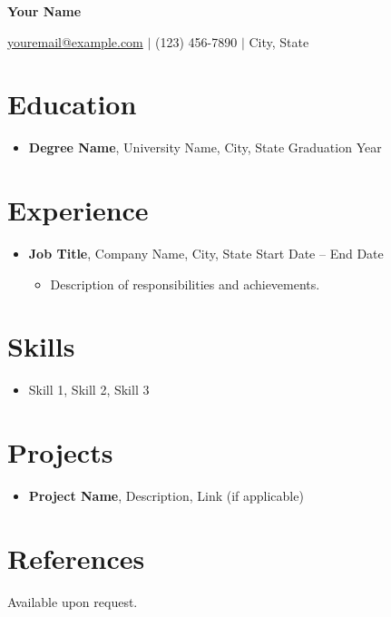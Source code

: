 \documentclass{article}
\begin{document}
\begin{center}
    \textbf{\LARGE Your Name}
    
    \vspace{0.5em}
    
    \small
    \href{mailto:youremail@example.com}{youremail@example.com} $\vert$ (123) 456-7890 $\vert$ City, State
\end{center}

\section*{Education}
\begin{itemize}[leftmargin=*]
    \item \textbf{Degree Name}, University Name, City, State \hfill Graduation Year
\end{itemize}

\section*{Experience}
\begin{itemize}[leftmargin=*]
    \item \textbf{Job Title}, Company Name, City, State \hfill Start Date -- End Date
    \begin{itemize}
        \item Description of responsibilities and achievements.
    \end{itemize}
\end{itemize}

\section*{Skills}
\begin{itemize}[leftmargin=*]
    \item Skill 1, Skill 2, Skill 3
\end{itemize}

\section*{Projects}
\begin{itemize}[leftmargin=*]
    \item \textbf{Project Name}, Description, Link (if applicable)
\end{itemize}

\section*{References}
Available upon request.
\end{document}
